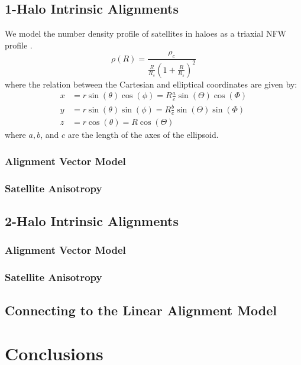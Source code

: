 \documentclass[fleqn,usenatbib]{mnras}
\begin{document}
\subsection{1-Halo Intrinsic Alignments}

We model the number density profile of satellites in haloes as a triaxial NFW profile \citep{Jing:2002bs}.
%
\begin{equation}
\rho(R) = \frac{\rho_c}{\frac{R}{R_s}\left( 1+\frac{R}{R_s} \right)^2}
\end{equation}
%
where the relation between the Cartesian and elliptical coordinates are given by:
%
\begin{align}
x &= r\sin(\theta)\cos(\phi) = R\frac{a}{c}\sin(\Theta)\cos(\Phi) \nonumber \\
y &= r\sin(\theta)\sin(\phi) = R\frac{b}{c}\sin(\Theta)\sin(\Phi) \nonumber \\
z &= r\cos(\theta) = R \cos(\Theta)
\end{align}
%
where $a,b$, and $c$ are the length of the axes of the ellipsoid.

\subsubsection{Alignment Vector Model}

\subsubsection{Satellite Anisotropy}

\subsection{2-Halo Intrinsic Alignments}

\subsubsection{Alignment Vector Model}

\subsubsection{Satellite Anisotropy}

\subsection{Connecting to the Linear Alignment Model}

\section{Conclusions}
\end{document}
